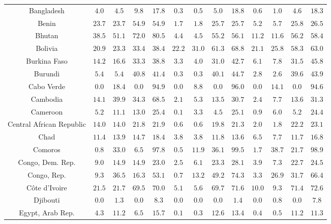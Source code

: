 \begin{longtable}{ccccccccccccc}
Bangladesh & $4.0$ & $4.5$ & $9.8$ & $17.8$ & $0.3$ & $0.5$ & $5.0$ & $18.8$ & $0.6$ & $1.0$ & $4.6$ & $18.3$ \\ 
Benin & $23.7$ & $23.7$ & $54.9$ & $54.9$ & $1.7$ & $1.8$ & $25.7$ & $25.7$ & $5.2$ & $5.7$ & $25.8$ & $26.5$ \\ 
Bhutan & $38.5$ & $51.1$ & $72.0$ & $80.5$ & $4.4$ & $4.5$ & $55.2$ & $56.1$ & $11.2$ & $11.6$ & $56.2$ & $58.4$ \\ 
Bolivia & $20.9$ & $23.3$ & $33.4$ & $38.4$ & $22.2$ & $31.0$ & $61.3$ & $68.8$ & $21.1$ & $25.8$ & $58.3$ & $63.0$ \\ 
Burkina Faso & $14.2$ & $16.6$ & $33.3$ & $38.8$ & $3.3$ & $4.0$ & $31.0$ & $42.7$ & $6.1$ & $7.8$ & $31.5$ & $45.8$ \\ 
Burundi & $5.4$ & $5.4$ & $40.8$ & $41.4$ & $0.3$ & $0.3$ & $40.1$ & $44.7$ & $2.8$ & $2.6$ & $39.6$ & $43.9$ \\ 
Cabo Verde & $0.0$ & $18.4$ & $0.0$ & $94.9$ & $0.0$ & $8.8$ & $0.0$ & $96.0$ & $0.0$ & $14.1$ & $0.0$ & $94.6$ \\ 
Cambodia & $14.1$ & $39.9$ & $34.3$ & $68.5$ & $2.1$ & $5.3$ & $13.5$ & $30.7$ & $2.4$ & $7.7$ & $13.6$ & $31.3$ \\ 
Cameroon & $5.2$ & $11.1$ & $13.0$ & $25.4$ & $0.1$ & $3.3$ & $4.5$ & $25.1$ & $0.9$ & $6.0$ & $5.2$ & $24.4$ \\ 
Central African Republic & $14.0$ & $14.0$ & $21.8$ & $21.9$ & $0.6$ & $0.6$ & $19.8$ & $21.3$ & $2.0$ & $1.8$ & $22.2$ & $23.1$ \\ 
Chad & $11.4$ & $13.9$ & $14.7$ & $18.4$ & $3.8$ & $3.8$ & $11.8$ & $13.6$ & $6.5$ & $7.7$ & $11.7$ & $16.8$ \\ 
Comoros & $0.8$ & $33.0$ & $6.5$ & $97.8$ & $0.5$ & $11.9$ & $36.1$ & $99.5$ & $1.7$ & $38.7$ & $21.7$ & $98.9$ \\ 
Congo, Dem. Rep. & $9.0$ & $14.9$ & $14.9$ & $23.0$ & $2.5$ & $6.1$ & $23.3$ & $28.1$ & $3.9$ & $7.3$ & $22.7$ & $24.5$ \\ 
Congo, Rep. & $9.3$ & $36.5$ & $16.3$ & $53.1$ & $0.7$ & $13.2$ & $49.2$ & $74.3$ & $3.3$ & $26.9$ & $31.7$ & $66.4$ \\ 
Côte d'Ivoire & $21.5$ & $21.7$ & $69.5$ & $70.0$ & $5.1$ & $5.6$ & $69.7$ & $71.6$ & $10.0$ & $9.3$ & $71.4$ & $72.6$ \\ 
Djibouti & $0.0$ & $1.3$ & $0.0$ & $8.3$ & $0.0$ & $0.0$ & $0.0$ & $1.4$ & $0.0$ & $0.8$ & $0.0$ & $7.8$ \\ 
Egypt, Arab Rep. & $4.3$ & $11.2$ & $6.5$ & $15.7$ & $0.1$ & $0.3$ & $12.6$ & $13.4$ & $0.4$ & $0.5$ & $11.2$ & $11.3$ \\ 

\end{longtable}
